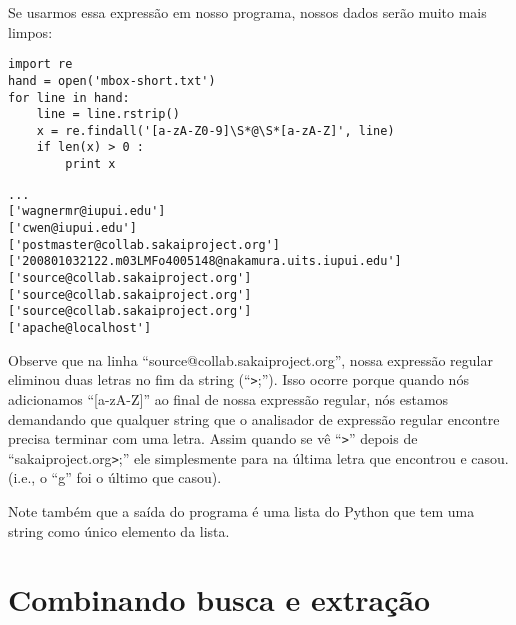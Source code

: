 
Se usarmos essa expressão em nosso programa, nossos dados serão muito mais limpos:

\beforeverb
\begin{verbatim}
import re
hand = open('mbox-short.txt')
for line in hand:
    line = line.rstrip()
    x = re.findall('[a-zA-Z0-9]\S*@\S*[a-zA-Z]', line)
    if len(x) > 0 :
        print x
\end{verbatim}
\afterverb
%

\beforeverb
\begin{verbatim}
...
['wagnermr@iupui.edu']
['cwen@iupui.edu']
['postmaster@collab.sakaiproject.org']
['200801032122.m03LMFo4005148@nakamura.uits.iupui.edu']
['source@collab.sakaiproject.org']
['source@collab.sakaiproject.org']
['source@collab.sakaiproject.org']
['apache@localhost']
\end{verbatim}
\afterverb
%

Observe que na linha ``source@collab.sakaiproject.org'', nossa expressão regular eliminou 
duas letras no fim da string (``\verb">";''). Isso ocorre porque quando nós adicionamos 
``[a-zA-Z]'' ao final de nossa expressão regular, nós estamos demandando que qualquer 
string que o analisador de expressão regular encontre precisa terminar com uma letra. 
Assim quando se vê ``\verb">"'' depois de ``sakaiproject.org\verb">";'' ele simplesmente 
para na última letra que encontrou e casou. (i.e., o ``g'' foi o último que casou).

Note também que a saída do programa é uma lista do Python que tem uma string como único 
elemento da lista.

\section{Combinando busca e extração}


